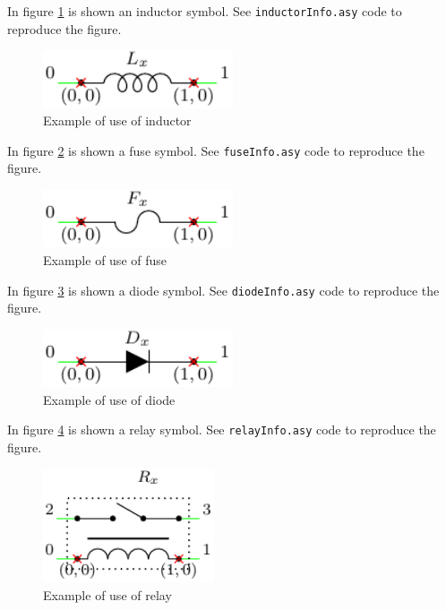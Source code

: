 \documentclass[a4paper,12pt]{report}
\begin{document}
In figure \ref{inductorInfo} is shown an inductor symbol. See \texttt{inductorInfo.asy} code to reproduce the figure.

\begin{figure}[ht]
\centering
\includegraphics[width=0.5\textwidth]{inductorInfo}
\caption{Example of use of inductor}
\label{inductorInfo}
\end{figure}

In figure \ref{fuseInfo} is shown a fuse symbol. See \texttt{fuseInfo.asy} code to reproduce the figure.

\begin{figure}[ht]
\centering
\includegraphics[width=0.5\textwidth]{fuseInfo}
\caption{Example of use of fuse}
\label{fuseInfo}
\end{figure}

In figure \ref{diodeInfo} is shown a diode symbol. See \texttt{diodeInfo.asy} code to reproduce the figure.

\begin{figure}[ht]
\centering
\includegraphics[width=0.5\textwidth]{diodeInfo}
\caption{Example of use of diode}
\label{diodeInfo}
\end{figure}

In figure \ref{relayInfo} is shown a relay symbol. See \texttt{relayInfo.asy} code to reproduce the figure.

\begin{figure}[ht]
\centering
\includegraphics[width=0.45\textwidth]{relayInfo}
\caption{Example of use of relay}
\label{relayInfo}
\end{figure}
\end{document}
